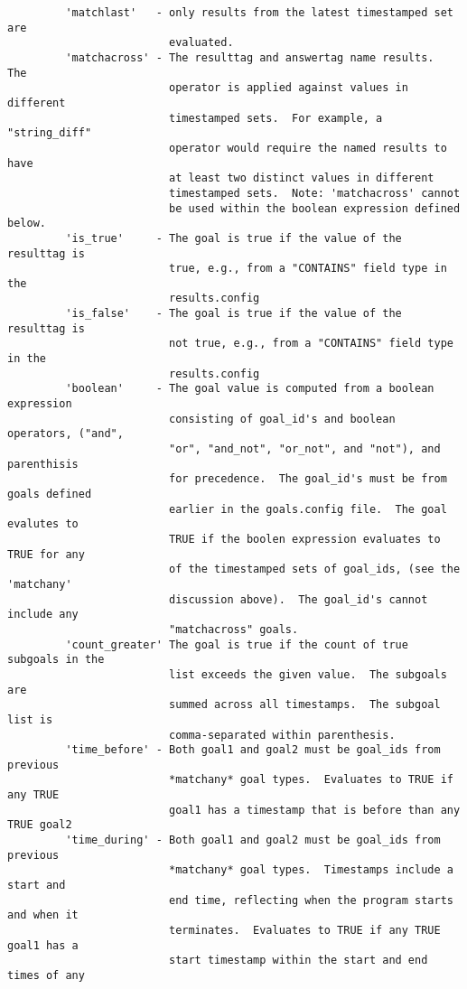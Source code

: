 \documentclass[12pt]{article}
\begin{document}
\begin{verbatim}
         'matchlast'   - only results from the latest timestamped set are 
                         evaluated.
         'matchacross' - The resulttag and answertag name results.  The 
                         operator is applied against values in different 
                         timestamped sets.  For example, a "string_diff" 
                         operator would require the named results to have 
                         at least two distinct values in different 
                         timestamped sets.  Note: 'matchacross' cannot 
                         be used within the boolean expression defined below.
         'is_true'     - The goal is true if the value of the resulttag is 
                         true, e.g., from a "CONTAINS" field type in the 
                         results.config
         'is_false'    - The goal is true if the value of the resulttag is 
                         not true, e.g., from a "CONTAINS" field type in the 
                         results.config
         'boolean'     - The goal value is computed from a boolean expression 
                         consisting of goal_id's and boolean operators, ("and", 
                         "or", "and_not", "or_not", and "not"), and parenthisis 
                         for precedence.  The goal_id's must be from goals defined 
                         earlier in the goals.config file.  The goal evalutes to 
                         TRUE if the boolen expression evaluates to TRUE for any
                         of the timestamped sets of goal_ids, (see the 'matchany' 
                         discussion above).  The goal_id's cannot include any 
                         "matchacross" goals.
         'count_greater' The goal is true if the count of true subgoals in the 
                         list exceeds the given value.  The subgoals are 
                         summed across all timestamps.  The subgoal list is 
                         comma-separated within parenthesis.
         'time_before' - Both goal1 and goal2 must be goal_ids from previous 
                         *matchany* goal types.  Evaluates to TRUE if any TRUE 
                         goal1 has a timestamp that is before than any TRUE goal2
         'time_during' - Both goal1 and goal2 must be goal_ids from previous 
                         *matchany* goal types.  Timestamps include a start and 
                         end time, reflecting when the program starts and when it 
                         terminates.  Evaluates to TRUE if any TRUE goal1 has a 
                         start timestamp within the start and end times of any 

\end{verbatim}
\end{document}
